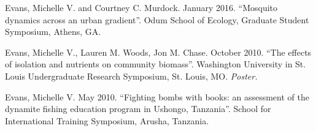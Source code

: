 \begin{cvitems}
	\item Evans, Michelle V. and Courtney C. Murdock. January 2016. ``Mosquito dynamics across an urban gradient''. Odum School of Ecology, Graduate Student Symposium, Athens, GA.

	\item Evans, Michelle V., Lauren M. Woods, Jon M. Chase. October 2010. ``The effects of isolation and nutrients on community biomass''. Washington University in St. Louis Undergraduate Research Symposium, St. Louis, MO. \textit{Poster.}

	\item Evans, Michelle V. May 2010. ``Fighting bombs with books: an assessment of the dynamite fishing education program in Ushongo, Tanzania''. School for International Training Symposium, Arusha, Tanzania.

	\bigskip
\end{cvitems}
